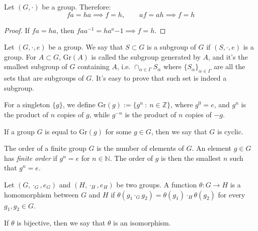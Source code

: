 \begin{proposition}
	Let $(G, \cdot)$ be a group. Therefore:
	\begin{displaymath}
		fa = ha \implies f = h, \quad \quad
		af = ah \implies f = h
	\end{displaymath}
\end{proposition}
\begin{proof}
	If $fa = ha$, then $fa a^{-1} = h a ^a{-1} \implies f = h$.
\end{proof}

\begin{definition}
	Let $(G, \cdot, e)$ be a group. We say that $S\subset G$ is a
	subgroup of $G$ if $(S, \cdot, e)$ is a group.
	For $A \subset G$, $\text{Gr}(A)$ is called the subgroup generated by $A$,
	and it's the smallest subgroup of $G$ containing $A$, i.e.
	$\cap_{\alpha \in \Gamma} S_\alpha$ where $\{S_\alpha\}_{\alpha \in \Gamma}$ are
	all the sets that are subgroups of $G$.
	It's easy to prove that such set is indeed a subgroup.

	For a singleton $\{g\}$, we define
	$\text{Gr}(g) := \{g^n \ : \ n \in \mathbb Z\}$, where
	$g^0 = e$, and $g^n$ is the product of $n$ copies of $g$,
	while $g^{-n}$ is the product of $n$ copies of $-g$.
\end{definition}

\begin{definition}
	If a group $G$ is equal to $\text{Gr}(g)$ for some $g \in G$,
	then we say that $G$ is cyclic.
\end{definition}

\begin{definition}
	The order of a finite group $G$ is the number of elements of $G$.
	An element $g \in G$ has \textit{finite order} if $g^n = e$
	for $n \in \mathbb N$. The order of $g$ is then
	the smallest $n$ such that $g^n = e$.
\end{definition}

\begin{definition}
	Let $(G, \cdot_G, e_G)$ and $(H, \cdot_H, e_H)$ be two groups. A function
	$\theta:G \to H$ is a homomorphism between $G$ and $H$ if
	$\theta(g_1 \cdot_G g_2) = \theta(g_1) \cdot_H \theta(g_2)$
	for every $g_1, g_2 \in G$.

	If $\theta$ is bijective, then we say that $\theta$
	is an isomorphism.
\end{definition}

